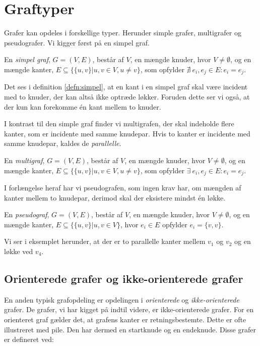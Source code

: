 \section{Graftyper}
Grafer kan opdeles i forskellige typer. Herunder simple grafer, multigrafer og pseudografer. Vi kigger først på en simpel graf.

\begin{defn} \label{defn:simpel}
En \emph{simpel graf}, $G=(V,E)$, består af $V$, en mængde knuder, hvor $V \neq \emptyset$, og en mængde kanter, $E \subseteq \{\{u,v\}|u,v \in V, u \neq v\}$, som opfylder $\nexists \ e_i, e_j \in E : e_i = e_j$.
\end{defn}

Det ses i definition \ref{defn:simpel}, at en kant i en simpel graf skal være incident med to knuder, der kan altså ikke optræde løkker. Foruden dette ser vi også, at der kun kan forekomme én kant mellem to knuder.



I kontrast til den simple graf finder vi multigrafen, der skal indeholde flere kanter, som er incidente med samme knudepar. Hvis to kanter er incidente med samme knudepar, kaldes de \emph{parallelle}.

\begin{defn}[Multigraf] \label{defn:multi}
En \emph{multigraf}, $ G = (V,E)$, består af $V$, en mængde knuder, hvor $V \neq \emptyset$, og en mængde kanter,
$E \subseteq \{\{u,v\}|u,v \in V, u \neq v\}$, som opfylder $\exists \ e_i, e_j \in E : e_i = e_j$.
\end{defn}



I forlængelse heraf har vi pseudografen, som ingen krav har, om mængden af kanter mellem to knudepar, derimod skal der eksistere mindst én løkke. 

\begin{defn}[Pseudograf] \label{defn:pseudo}
En \emph{pseudograf}, $ G = (V,E)$, består af $V$, en mængde knuder, hvor $V \neq \emptyset$, og en mængde kanter, $E \subseteq \{\{u,v\}|u,v \in V\}$, hvor $e_i \in E$ opfylder $e_i = \{v,v\}$.
\end{defn}

Vi ser i eksemplet herunder, at der er to parallelle kanter mellem $v_{1}$ og $v_{2}$ og en løkke ved $v_{4}$.




\subsection{Orienterede grafer og ikke-orienterede grafer}
En anden typisk grafopdeling er opdelingen i \emph{orienterede} og \emph{ikke-orienterede} grafer. De grafer, vi har kigget på indtil videre, er ikke-orienterede grafer. For en orienteret graf gælder det, at grafens kanter er retningsbestemte. Dette er ofte illustreret med pile. Den har dermed en startknude og en endeknude. Disse grafer er defineret ved:

